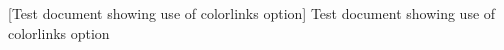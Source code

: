 [Test document showing use of colorlinks option]{%
 Test document showing use of colorlinks option
}%
